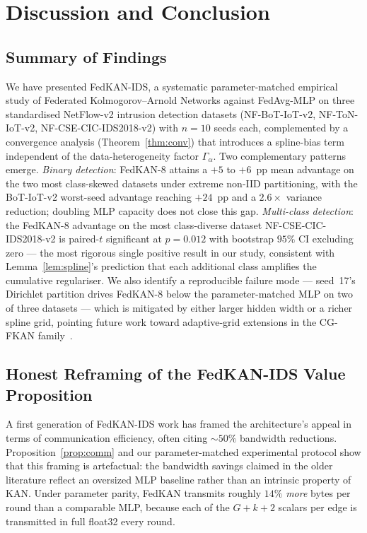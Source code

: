 \section{Discussion and Conclusion}\label{sec:conclusion}

\subsection{Summary of Findings}

We have presented FedKAN-IDS, a systematic parameter-matched empirical study of Federated Kolmogorov--Arnold Networks against FedAvg-MLP on three standardised NetFlow-v2 intrusion detection datasets (NF-BoT-IoT-v2, NF-ToN-IoT-v2, NF-CSE-CIC-IDS2018-v2) with $n = 10$ seeds each, complemented by a convergence analysis (Theorem~\ref{thm:conv}) that introduces a spline-bias term independent of the data-heterogeneity factor $\Gamma_\alpha$. Two complementary patterns emerge. \emph{Binary detection}: FedKAN-8 attains a $+5$ to $+6$~pp mean advantage on the two most class-skewed datasets under extreme non-IID partitioning, with the BoT-IoT-v2 worst-seed advantage reaching $+24$~pp and a $2.6\times$ variance reduction; doubling MLP capacity does not close this gap. \emph{Multi-class detection}: the FedKAN-8 advantage on the most class-diverse dataset NF-CSE-CIC-IDS2018-v2 is paired-$t$ significant at $p = 0.012$ with bootstrap $95\%$ CI excluding zero --- the most rigorous single positive result in our study, consistent with Lemma~\ref{lem:spline}'s prediction that each additional class amplifies the cumulative regulariser. We also identify a reproducible failure mode --- seed~17's Dirichlet partition drives FedKAN-8 below the parameter-matched MLP on two of three datasets --- which is mitigated by either larger hidden width or a richer spline grid, pointing future work toward adaptive-grid extensions in the CG-FKAN family~\cite{yu2025cgfkan}.

\subsection{Honest Reframing of the FedKAN-IDS Value Proposition}

A first generation of FedKAN-IDS work \cite{sasse2024evaluating} has framed the architecture's appeal in terms of communication efficiency, often citing $\sim 50\%$ bandwidth reductions. Proposition~\ref{prop:comm} and our parameter-matched experimental protocol show that this framing is artefactual: the bandwidth savings claimed in the older literature reflect an oversized MLP baseline rather than an intrinsic property of KAN. Under parameter parity, FedKAN transmits roughly $14\%$ \emph{more} bytes per round than a comparable MLP, because each of the $G+k+2$ scalars per edge is transmitted in full float32 every round.

